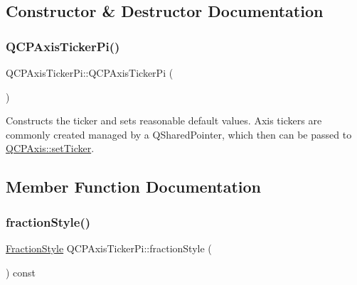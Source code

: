 \subsection{Constructor \& Destructor Documentation}
\mbox{\label{class_q_c_p_axis_ticker_pi_aa0d7b7034055927c0f0077a2d713d7d0}} 
\subsubsection{\texorpdfstring{QCPAxisTickerPi()}{QCPAxisTickerPi()}}
{\footnotesize\ttfamily Q\+C\+P\+Axis\+Ticker\+Pi\+::\+Q\+C\+P\+Axis\+Ticker\+Pi (\begin{DoxyParamCaption}{ }\end{DoxyParamCaption})}

Constructs the ticker and sets reasonable default values. Axis tickers are commonly created managed by a Q\+Shared\+Pointer, which then can be passed to \mbox{\hyperlink{class_q_c_p_axis_a4ee03fcd2c74d05cd1a419b9af5cfbdc}{Q\+C\+P\+Axis\+::set\+Ticker}}. 

\subsection{Member Function Documentation}
\mbox{\label{class_q_c_p_axis_ticker_pi_ab532d5e838168a8a5bbafea4eafc94be}} 
\subsubsection{\texorpdfstring{fractionStyle()}{fractionStyle()}}
{\footnotesize\ttfamily \mbox{\hyperlink{class_q_c_p_axis_ticker_pi_a262f1534c7f0c79a7d5237f5d1e2c54c}{Fraction\+Style}} Q\+C\+P\+Axis\+Ticker\+Pi\+::fraction\+Style (\begin{DoxyParamCaption}{ }\end{DoxyParamCaption}) const\hspace{0.3cm}{\ttfamily [inline]}}

\mbox{\label{class_q_c_p_axis_ticker_pi_afb59d434358173eb5b58e41255bea904}} 

